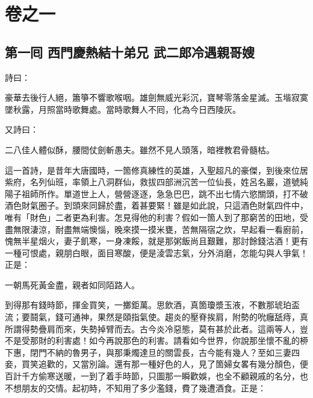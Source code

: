 \part*{{\titlename}卷之一}



\chapter*{第一囘 西門慶熱結十弟兄 武二郎冷遇親哥嫂}


詩曰：

豪華去後行人絕，簫箏不響歌喉咽。雄劍無威光彩沉，寶琴零落金星滅。玉堦寂寞墜秋露，月照當時歌舞處。當時歌舞人不囘，化為今日西陵灰。{}

又詩曰：

二八佳人體似酥，腰間仗劍斬愚夫。{}雖然不見人頭落，暗裡教君骨髓枯。

這一首詩，是昔年大唐國時，一箇修真練性的英雄，入聖超凡的豪傑，到後來位居紫府，名列仙班，率領上八洞群仙，救拔四部洲沉苦一位仙長，姓呂名巖，道號純陽子祖師所作。單道世上人，營營逐逐，急急巴巴，跳不出七情六慾關頭，打不破酒色財氣圈子。到頭來同歸於盡，着甚要緊！雖是如此說，只這酒色財氣四件中，唯有「財色」二者更為利害。怎見得他的利害？假如一箇人到了那窮苦的田地，受盡無限淒涼，耐盡無端懊惱，晚來摸一摸米甕，苦無隔宿之炊，早起看一看廚前，愧無半星烟火，妻子飢寒，一身凍餒，{}就是那粥飯尚且艱難，那討餘錢沽酒！{}更有一種可恨處，親朋白眼，面目寒酸，便是淩雲志氣，分外消磨，怎能勾與人爭氣！{}正是：

一朝馬死黃金盡，親者如同陌路人。

到得那有錢時節，揮金買笑，一擲鉅萬。思飲酒，真箇瓊漿玉液，{}不數那琥珀盃流；要鬪氣，錢可通神，果然是頤指氣使。{}趨炎的壓脊挨肩，附勢的吮癰舐痔，真所謂得勢疊肩而來，失勢掉臂而去。古今炎冷惡態，莫有甚於此者。這兩等人，豈不是受那財的利害處！如今再說那色的利害。{}請看如今世界，你說那坐懷不亂的桺下惠，閉門不納的魯男子，與那秉燭達旦的關雲長，古今能有幾人？至如三妻四妾，買笑追歡的，又當別論。還有那一種好色的人，見了箇婦女畧有幾分顏色，便百計千方偷寒送暖，一到了着手時節，只圖那一瞬歡娛，也全不顧親戚的名分，也不想朋友的交情。起初時，不知用了多少濫錢，費了幾遭酒食。{}正是：

